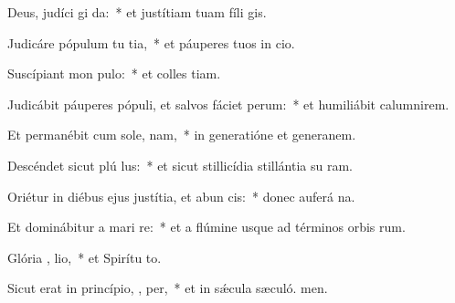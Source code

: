 \item Deus, judíci  gi da:~* et justítiam tuam fíli gis.
\item Judicáre pópulum tu  tia,~* et páuperes tuos in cio.
\item Suscípiant mon  pulo:~* et colles tiam.
\item Judicábit páuperes pópuli, et salvos fáciet  perum:~* et humiliábit calumnirem.
\item Et permanébit cum sole,   nam,~* in generatióne et generanem.
\item Descéndet sicut plú  lus:~* et sicut stillicídia stillántia su ram.
\item Oriétur in diébus ejus justítia, et abun cis:~* donec auferá na.
\item Et dominábitur a mari   re:~* et a flúmine usque ad términos orbis rum.
\item Glória ,  lio,~* et Spirítu to.
\item Sicut erat in princípio,  ,  per,~* et in sǽcula sæculó. men.
